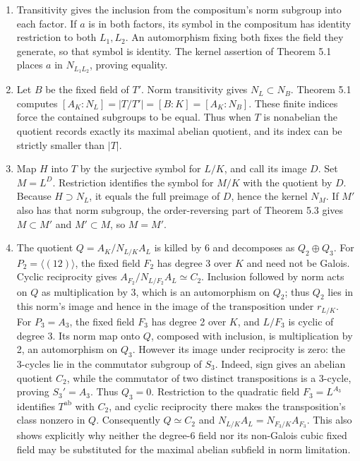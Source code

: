\documentclass[11pt,a4paper]{article}
\newcommand{\tightlist}{\setlength{\itemsep}{0pt}\setlength{\parskip}{0pt}}
\begin{document}
\begin{enumerate}
\def\labelenumi{\arabic{enumi}.}
\tightlist
\item
  Transitivity gives the inclusion from the compositum's norm subgroup
  into each factor. If \(a\) is in both factors, its symbol in the
  compositum has identity restriction to both \(L_1,L_2\). An
  automorphism fixing both fixes the field they generate, so that symbol
  is identity. The kernel assertion of Theorem 5.1 places \(a\) in
  \(N_{L_1L_2}\), proving equality.
\item
  Let \(B\) be the fixed field of \(T'\). Norm transitivity gives
  \(N_L\subset N_B\). Theorem 5.1 computes
  \([A_K:N_L]=|T/T'|=[B:K]=[A_K:N_B]\). These finite indices force the
  contained subgroups to be equal. Thus when \(T\) is nonabelian the
  quotient records exactly its maximal abelian quotient, and its index
  can be strictly smaller than \(|T|\).
\item
  Map \(H\) into \(T\) by the surjective symbol for \(L/K\), and call
  its image \(D\). Set \(M=L^D\). Restriction identifies the symbol for
  \(M/K\) with the quotient by \(D\). Because \(H\supset N_L\), it
  equals the full preimage of \(D\), hence the kernel \(N_M\). If \(M'\)
  also has that norm subgroup, the order-reversing part of Theorem 5.3
  gives \(M\subset M'\) and \(M'\subset M\), so \(M=M'\).
\item
  The quotient \(Q=A_K/N_{L/K}A_L\) is killed by 6 and decomposes as
  \(Q_2\oplus Q_3\). For \(P_2=\langle(12)\rangle\), the fixed field
  \(F_2\) has degree 3 over \(K\) and need not be Galois. Cyclic
  reciprocity gives \(A_{F_2}/N_{L/F_2}A_L\simeq C_2\). Inclusion
  followed by norm acts on \(Q\) as multiplication by 3, which is an
  automorphism on \(Q_2\); thus \(Q_2\) lies in this norm's image and
  hence in the image of the transposition under \(r_{L/K}\). For
  \(P_3=A_3\), the fixed field \(F_3\) has degree 2 over \(K\), and
  \(L/F_3\) is cyclic of degree 3. Its norm map onto \(Q\), composed
  with inclusion, is multiplication by 2, an automorphism on \(Q_3\).
  However its image under reciprocity is zero: the 3-cycles lie in the
  commutator subgroup of \(S_3\). Indeed, sign gives an abelian quotient
  \(C_2\), while the commutator of two distinct transpositions is a
  3-cycle, proving \(S_3'=A_3\). Thus \(Q_3=0\). Restriction to the
  quadratic field \(F_3=L^{A_3}\) identifies \(T^{\mathrm{ab}}\) with
  \(C_2\), and cyclic reciprocity there makes the transposition's class
  nonzero in \(Q\). Consequently \(Q\simeq C_2\) and
  \(N_{L/K}A_L=N_{F_3/K}A_{F_3}\). This also shows explicitly why
  neither the degree-6 field nor its non-Galois cubic fixed field may be
  substituted for the maximal abelian subfield in norm limitation.
\end{enumerate}
\end{document}
